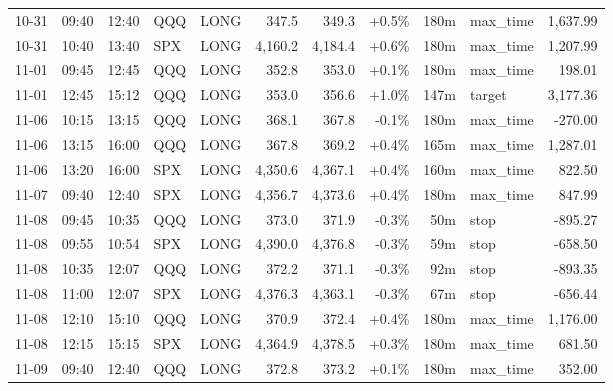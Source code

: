 \documentclass[11pt,a4paper,twoside]{article}
\begin{document}
\begin{center}
\begin{longtable}{>{\color{txtmain}}l l l l l r r r r >{\color{txtmain}}l r}
10-31 & 09:40 & 12:40 & QQQ & LONG & 347.5 & 349.3 & \textcolor{wingreen}{+0.5\%} & 180m & max\_time & \textcolor{wingreen}{1,637.99} \\
10-31 & 10:40 & 13:40 & SPX & LONG & 4,160.2 & 4,184.4 & \textcolor{wingreen}{+0.6\%} & 180m & max\_time & \textcolor{wingreen}{1,207.99} \\
11-01 & 09:45 & 12:45 & QQQ & LONG & 352.8 & 353.0 & \textcolor{wingreen}{+0.1\%} & 180m & max\_time & \textcolor{wingreen}{198.01} \\
11-01 & 12:45 & 15:12 & QQQ & LONG & 353.0 & 356.6 & \textcolor{wingreen}{+1.0\%} & 147m & target & \textcolor{wingreen}{3,177.36} \\
11-06 & 10:15 & 13:15 & QQQ & LONG & 368.1 & 367.8 & \textcolor{lossred}{-0.1\%} & 180m & max\_time & \textcolor{lossred}{-270.00} \\
11-06 & 13:15 & 16:00 & QQQ & LONG & 367.8 & 369.2 & \textcolor{wingreen}{+0.4\%} & 165m & max\_time & \textcolor{wingreen}{1,287.01} \\
11-06 & 13:20 & 16:00 & SPX & LONG & 4,350.6 & 4,367.1 & \textcolor{wingreen}{+0.4\%} & 160m & max\_time & \textcolor{wingreen}{822.50} \\
11-07 & 09:40 & 12:40 & SPX & LONG & 4,356.7 & 4,373.6 & \textcolor{wingreen}{+0.4\%} & 180m & max\_time & \textcolor{wingreen}{847.99} \\
11-08 & 09:45 & 10:35 & QQQ & LONG & 373.0 & 371.9 & \textcolor{lossred}{-0.3\%} & 50m & stop & \textcolor{lossred}{-895.27} \\
11-08 & 09:55 & 10:54 & SPX & LONG & 4,390.0 & 4,376.8 & \textcolor{lossred}{-0.3\%} & 59m & stop & \textcolor{lossred}{-658.50} \\
11-08 & 10:35 & 12:07 & QQQ & LONG & 372.2 & 371.1 & \textcolor{lossred}{-0.3\%} & 92m & stop & \textcolor{lossred}{-893.35} \\
11-08 & 11:00 & 12:07 & SPX & LONG & 4,376.3 & 4,363.1 & \textcolor{lossred}{-0.3\%} & 67m & stop & \textcolor{lossred}{-656.44} \\
11-08 & 12:10 & 15:10 & QQQ & LONG & 370.9 & 372.4 & \textcolor{wingreen}{+0.4\%} & 180m & max\_time & \textcolor{wingreen}{1,176.00} \\
11-08 & 12:15 & 15:15 & SPX & LONG & 4,364.9 & 4,378.5 & \textcolor{wingreen}{+0.3\%} & 180m & max\_time & \textcolor{wingreen}{681.50} \\
11-09 & 09:40 & 12:40 & QQQ & LONG & 372.8 & 373.2 & \textcolor{wingreen}{+0.1\%} & 180m & max\_time & \textcolor{wingreen}{352.00} \\

\end{longtable}
\end{center}
\end{document}
